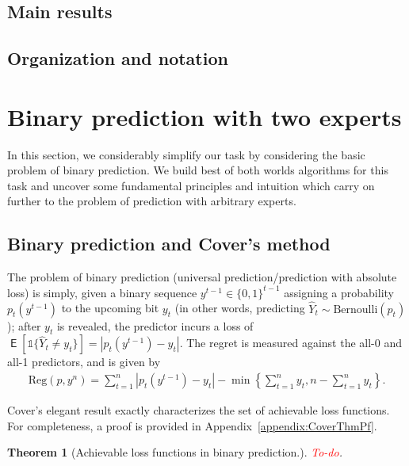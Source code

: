 \documentclass[11pt,letter]{article}
\newtheorem{theorem}{Theorem}
\newcommand{\Ind}{\mathds{1}}
\newcommand{\Ber}{\mathrm{Bernoulli}}
\newcommand{\redt}{\textcolor{red}}
\newcommand{\Reg}{\mathrm{Reg}}
\DeclareMathOperator\E{\textsf{E}}
\begin{document}
\subsection{Main results}

\subsection{Organization and notation}

\section{Binary prediction with two experts}

In this section, we considerably simplify our task by considering the basic problem of binary prediction. We build best of both worlds algorithms for this task and uncover some fundamental principles and intuition which carry on further to the problem of prediction with arbitrary experts.
\subsection{Binary prediction and Cover's method}

The problem of binary prediction (universal prediction/prediction with absolute loss) is simply, given a binary sequence $y^{t-1} \in \{0,1\}^{t-1}$ assigning a probability $p_t(y^{t-1})$ to the upcoming bit $y_t$ (in other words, predicting $\widehat{Y}_t \sim \Ber(p_t)$); after $y_t$ is revealed, the predictor incurs a loss of $\E[\Ind\{\widehat{Y}_t \neq y_t\}] = |p_t(y^{t-1})-y_t|$. The regret is measured against the all-0 and all-1 predictors, and is given by 
\begin{align}\label{eq:BinPredReg}
    \Reg(p,y^n) = \sum_{t=1}^n |p_t(y^{t-1})-y_t| - \min\left\{\sum_{t=1}^n y_t, n - \sum_{t=1}^n y_t\right\}.
\end{align}

Cover's elegant result exactly characterizes the set of achievable loss functions. For completeness, a proof is provided in Appendix~\ref{appendix:CoverThmPf}.
\begin{theorem}[Achievable loss functions in binary prediction.] \label{thm:CoverBinPred}
    \redt{To-do}.
\end{theorem}
\end{document}
